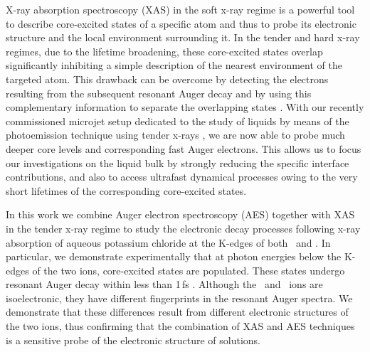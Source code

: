 {\color{red}X-ray absorption spectroscopy (XAS) in the soft x-ray regime is a powerful tool to describe core-excited states of a specific atom and thus to probe its electronic structure and the local environment surrounding it. In the tender and hard x-ray regimes, due to the lifetime broadening, these core-excited states overlap significantly inhibiting a simple description of the nearest environment of the targeted atom. This drawback can be overcome by detecting the electrons resulting from the subsequent resonant Auger decay and by using this complementary information to separate the overlapping states \citep{foehlisch05:373,goldsz16:15133}.}
With our recently commissioned microjet setup dedicated to the study of liquids by means of the photoemission technique using tender x-rays \citep{ceolin13:188,rueff15:175}, we are now able to probe much deeper core levels and corresponding fast Auger electrons. This allows us to focus our investigations on the liquid bulk by strongly reducing the specific interface contributions, and also to access ultrafast dynamical processes owing to the very short lifetimes of the corresponding core-excited states.


In this work we combine Auger electron spectroscopy (AES) together with XAS in the tender x-ray regime to study the electronic decay processes following x-ray absorption of aqueous potassium chloride at the K-edges of both \ki~and \cli. In particular, we demonstrate experimentally that at photon energies below the K-edges of the two ions, core-excited states are populated. These states undergo resonant Auger decay within less than 1\,fs \citep{ceolin17:263003}. Although the \ki~and \cli~ions are isoelectronic, they have different fingerprints in the resonant Auger spectra. We demonstrate that these differences result from different electronic structures of the two ions, thus confirming that the combination of XAS and AES techniques is a sensitive probe of the electronic structure of solutions.


